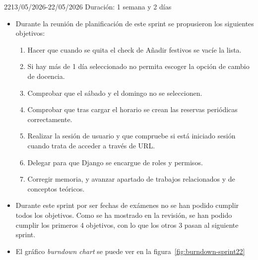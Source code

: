 \begin{Sprint}{22}{13/05/2026-22/05/2026}
	Duración: 1 semana y 2 días
	\begin{itemize}	
		\item{}
		Durante la reunión de planificación de este sprint se propusieron los siguientes objetivos:
		\begin{enumerate}
			\item Hacer que cuando se quita el check de Añadir festivos se vacíe la lista.
			\item Si hay más de 1 día seleccionado no permita escoger la opción de cambio de docencia.
			\item Comprobar que el sábado y el domingo no se seleccionen.
			\item Comprobar que tras cargar el horario se crean las reservas periódicas correctamente.
			\item Realizar la sesión de usuario y que compruebe si está iniciado sesión cuando trata de acceder a través de URL.
			\item Delegar para que Django se encargue de roles y permisos.
			\item Corregir memoria, y avanzar apartado de trabajos relacionados y de conceptos teóricos.
		\end{enumerate}
		\item{}
		Durante este sprint por ser fechas de exámenes no se han podido cumplir todos los objetivos. Como se ha mostrado en la revisión, se han podido cumplir los primeros 4 objetivos, con lo que los otros 3 pasan al siguiente sprint.
		
		\item{}
		El gráfico \textit{burndown chart} se puede ver en la figura~\ref{fig:burndown-sprint22}
	\end{itemize}
\end{Sprint}

